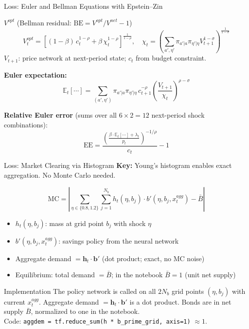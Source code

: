 \documentclass[aspectratio=169,11pt]{beamer}
\newcommand{\emphc}[1]{\textcolor{harvardcrimson}{#1}}
\begin{document}
\begin{frame}{Loss: Euler and Bellman Equations with Epstein--Zin}
\small

\begin{block}{$V^{opt}$ (Bellman residual: $\text{BE} = V^{opt}/V^{net} - 1$)}
\vspace{-2pt}
\[
V^{opt}_t = \!\left[(1-\beta)\,c_t^{1-\rho} + \beta\,\chi_t^{1-\rho}\right]^{\!\frac{1}{1-\rho}},\quad
\chi_t = \!\left(\sum_{a',\eta'}\pi_{a'|a}\pi_{\eta'|\eta}V_{t+1}^{1-\sigma}\right)^{\!\frac{1}{1-\sigma}}
\]
\vspace{-4pt}
{\footnotesize $V_{t+1}$: price network at next-period state; $c_t$ from budget constraint.}
\end{block}

\vspace{0.15em}
\textbf{Euler expectation:}
\[
\mathbb{E}_t[\cdots] = \sum_{(a',\eta')} \pi_{a'|a}\pi_{\eta'|\eta}\, c_{t+1}^{-\rho} \left(\frac{V_{t+1}}{\chi_t}\right)^{\!\rho - \sigma}
\]

\vspace{0.1em}
\textbf{Relative Euler error} (sums over all $6 \times 2 = 12$ next-period shock combinations):
\[
\boxed{\text{EE} = \frac{\left(\frac{\beta \cdot \mathbb{E}_t[\cdots] + \lambda_t}{p_t}\right)^{-1/\rho}}{c_t} - 1}
\]
\end{frame}

\begin{frame}{Loss: Market Clearing via Histogram}
\textbf{Key:} Young's histogram enables \emphc{exact aggregation}. No Monte Carlo needed.

\vspace{0.2em}
\[
\boxed{\text{MC} = \left|\sum_{\eta \in \{0.8, 1.2\}} \sum_{j=1}^{N_b} h_t(\eta, b_j) \cdot b'\!(\eta, b_j, x_t^{agg}) - \bar B\right|}
\]

\vspace{0.2em}
\begin{itemize}\itemsep1pt
    \item $h_t(\eta, b_j)$: mass at grid point $b_j$ with shock $\eta$
    \item $b'(\eta, b_j, x_t^{agg})$: savings policy from the neural network
    \item \emphc{Aggregate demand} $= \mathbf{h}_t \cdot \mathbf{b}'$ (dot product; exact, no MC noise)
    \item Equilibrium: total demand $= \bar B$; in the notebook $\bar B=1$ (\emphc{unit net supply})
\end{itemize}

\vspace{0.2em}
\begin{alertblock}{Implementation}
\small
The policy network is called on all $2N_b$ grid points $(\eta,b_j)$ with current $x_t^{agg}$.
Aggregate demand $= \mathbf{h}_t \cdot \mathbf{b}'$ is a dot product. Bonds are in net supply $\bar B$, normalized to \emphc{one} in the notebook.\\[1pt]
{\footnotesize Code: \texttt{aggdem = tf.reduce\_sum(h * b\_prime\_grid, axis=1)} $\approx 1$.}
\end{alertblock}
\end{frame}
\end{document}
